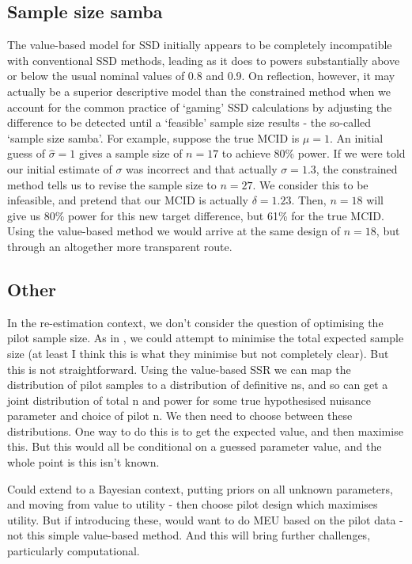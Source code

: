 \documentclass[sagev, Crown]{sagej}
\begin{document}
\subsection{Sample size samba}

The value-based model for SSD initially appears to be completely incompatible with conventional SSD methods, leading as it does to powers substantially above or below the usual nominal values of 0.8 and 0.9. On reflection, however, it may actually be a superior descriptive model than the constrained method when we account for the common practice of `gaming' SSD calculations by adjusting the difference to be detected until a `feasible' sample size results - the so-called `sample size samba'. For example, suppose the true MCID is $\mu = 1$. An initial guess of $\hat{\sigma} = 1$ gives a sample size of $n = 17$ to achieve 80\% power. If we were told our initial estimate of $\sigma$ was incorrect and that actually $\sigma = 1.3$, the constrained method tells us to revise the sample size to $n = 27$. We consider this to be infeasible, and pretend that our MCID is actually $\delta = 1.23$. Then, $n = 18$ will give us 80\% power for this new target difference, but 61\% for the true MCID. Using the value-based method we would arrive at the same design of $n = 18$, but through an altogether more transparent route.

\subsection{Other}

In the re-estimation context, we don't consider the question of optimising the pilot sample size. As in \cite{Whitehead2015}, we could attempt to minimise the total expected sample size (at least I think this is what they minimise but not completely clear). But this is not straightforward. Using the value-based SSR we can map the distribution of pilot samples to a distribution of definitive ns, and so can get a joint distribution of total n and power for some true hypothesised nuisance parameter and choice of pilot n. We then need to choose between these distributions. One way to do this is to get the expected value, and then maximise this. But this would all be conditional on a guessed parameter value, and the whole point is this isn't known.

Could extend to a Bayesian context, putting priors on all unknown parameters, and moving from value to utility - then choose pilot design which maximises utility. But if introducing these, would want to do MEU based on the pilot data - not this simple value-based method. And this will bring further challenges, particularly computational.
\end{document}
